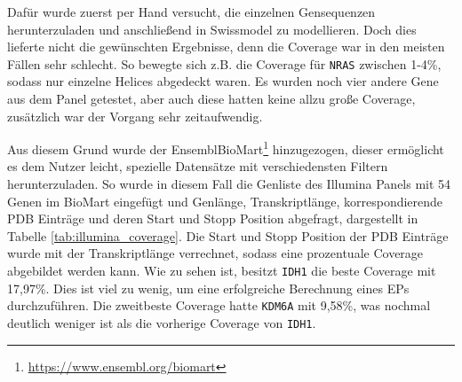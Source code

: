 Dafür wurde zuerst per Hand versucht, die einzelnen Gensequenzen herunterzuladen und anschließend in Swissmodel zu modellieren. Doch dies lieferte nicht die gewünschten Ergebnisse, denn die Coverage war in den meisten Fällen sehr schlecht. So bewegte sich z.B. die Coverage für \texttt{NRAS} zwischen 1-4\%, sodass nur einzelne Helices abgedeckt waren. Es wurden noch vier andere Gene aus dem Panel getestet, aber auch diese hatten keine allzu große Coverage, zusätzlich war der Vorgang sehr zeitaufwendig. 

\begin{table}[H]
    \centering
    \caption{Illumina TruSight Myeloid Sequencing Panel Gene, es sind die Gennamen, Genlänge in Basenpaaren (bp), Transkriptlänge ist mit UTRs und CDS, PDB Template IDs und PDB Coverage angegeben.}
    \label{tab:illumina_coverage}
\end{table}

Aus diesem Grund wurde der EnsemblBioMart\footnote{\url{https://www.ensembl.org/biomart}} hinzugezogen, dieser ermöglicht es dem Nutzer leicht, spezielle Datensätze mit verschiedensten Filtern herunterzuladen. So wurde in diesem Fall die Genliste des Illumina Panels mit 54 Genen im BioMart eingefügt und Genlänge, Transkriptlänge, korrespondierende \ac{PDB} Einträge und deren Start und Stopp Position abgefragt, dargestellt in Tabelle \ref{tab:illumina_coverage}. Die Start und Stopp Position der \ac{PDB} Einträge wurde mit der Transkriptlänge verrechnet, sodass eine prozentuale Coverage abgebildet werden kann. Wie zu sehen ist, besitzt \texttt{IDH1} die beste Coverage mit 17,97\%. Dies ist viel zu wenig, um eine erfolgreiche Berechnung eines \ac{EP}s durchzuführen. Die zweitbeste Coverage hatte \texttt{KDM6A} mit 9,58\%, was nochmal deutlich weniger ist als die vorherige Coverage von \texttt{IDH1}.

